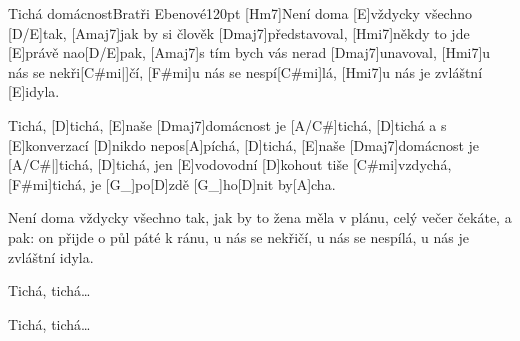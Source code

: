 \begin{song}{Tichá domácnost}{Bratři Ebenové}{120pt}
%
[Hm7]Není doma [E]vždycky všechno [D/E]tak,
[Amaj7]jak by si člověk [Dmaj7]představoval,
[Hmi7]někdy to jde [E]právě nao[D/E]pak,
[Amaj7]s tím bych vás nerad [Dmaj7]unavoval,
[Hmi7]u nás se nekři[C#mi|]{čí,} [F#mi]u nás se nespí[C#mi]lá,
[Hmi7]u nás je zvláštní [E]idyla.

\chorus%
[A]Tichá, [D]tichá, [E]naše [Dmaj7]domácnost je [A/C#]{tichá,} [D]tichá
a s [E]konverzací [D]nikdo nepos[A]píchá,
[D]tichá, [E]naše [Dmaj7]domácnost je [A/C#|]{tichá,} [D]tichá,
jen [E]vodovodní [D]kohout tiše [C#mi]vzdychá, [F#mi]tichá,
je [G_]{po}[D]zdě [G_]{ho}[D]nit by[A]cha.

%
Není doma vždycky všechno tak,
jak by to žena měla v plánu,
celý večer čekáte, a pak:
on přijde o půl páté k ránu,
u nás se nekřičí, u nás se nespílá,
u nás je zvláštní idyla.

\chorus%
Tichá, tichá\dots


\chorus%
Tichá, tichá\dots
\end{song}

